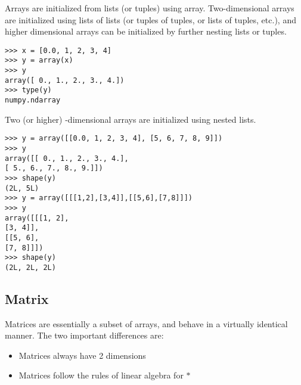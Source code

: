 \documentclass[KSmain.tex]{subfiles}
\begin{document}
Arrays are initialized from lists (or tuples) using array. Two-dimensional arrays are initialized using
lists of lists (or tuples of tuples, or lists of tuples, etc.), and higher dimensional arrays can be initialized by
further nesting lists or tuples.

\begin{framed}
\begin{verbatim}
>>> x = [0.0, 1, 2, 3, 4]
>>> y = array(x)
>>> y
array([ 0., 1., 2., 3., 4.])
>>> type(y)
numpy.ndarray
\end{verbatim}
\end{framed}
Two (or higher) -dimensional arrays are initialized using nested lists.
\begin{framed}
\begin{verbatim}
>>> y = array([[0.0, 1, 2, 3, 4], [5, 6, 7, 8, 9]])
>>> y
array([[ 0., 1., 2., 3., 4.],
[ 5., 6., 7., 8., 9.]])
>>> shape(y)
(2L, 5L)
>>> y = array([[[1,2],[3,4]],[[5,6],[7,8]]])
>>> y
array([[[1, 2],
[3, 4]],
[[5, 6],
[7, 8]]])
>>> shape(y)
(2L, 2L, 2L)
\end{verbatim}
\end{framed}

\subsection{Matrix}
Matrices are essentially a subset of arrays, and behave in a virtually identical manner. The two important
differences are:

\begin{itemize}
\item Matrices always have 2 dimensions
\item Matrices follow the rules of linear algebra for $\ast$
\end{itemize}

\newpage
\end{document}
